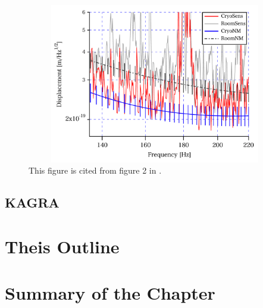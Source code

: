 \begin{figure}[h]
  \begin{center}   
    \includegraphics[width=12cm,height=7cm]{./img_chap1/img123.png}
    \caption{This figure is cited from figure 2 in \cite{uchiyama2012reduction}. } \label{img:img123}
  \end{center}
\end{figure}

\subsection{KAGRA}
\section{Theis Outline}

\section{Summary of the Chapter}
